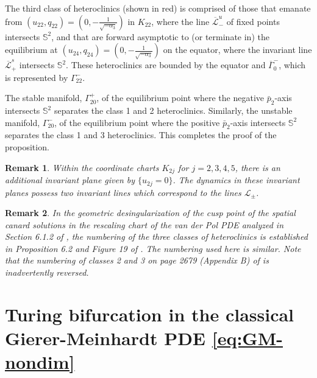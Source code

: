 \documentclass[11pt]{article}
\numberwithin{equation}{section}
\newtheorem{remark}{Remark}[section]
\begin{document}
The third class of heteroclinics (shown in red) is comprised of those that emanate from $(u_{22},q_{22})=(0,-\frac{1}{\sqrt{-\alpha_3}})$ in $K_{22}$, where the line $\overline{\mathcal{L}}^u_-$ of fixed points intersects $\mathbb{S}^2$, and that are forward asymptotic to (or terminate in) the equilibrium at $(u_{24},q_{24})=(0,-\frac{1}{\sqrt{-\alpha_3}})$ on the equator, where the invariant line $\overline{\mathcal{L}}_+^s$ intersects $\mathbb{S}^2$.
These heteroclinics are bounded by the equator and $\overline{\Gamma}_0^-$, which is represented by $\Gamma_{22}^-$.

The stable manifold, $\Gamma_{20}^+$, of the equilibrium point where the negative $\bar{p}_2$-axis intersects $\mathbb{S}^2$ separates the class 1 and 2 heteroclinics.
Similarly, the unstable manifold, $\Gamma_{20}^-$, of the equilibrium point where the positive $\bar{p}_2$-axis intersects $\mathbb{S}^2$ separates the class 1 and 3 heteroclinics.
This completes the proof of the proposition.

\begin{remark}
Within the coordinate charts $K_{2j}$ for $j=2,3,4,5$, there is an additional invariant plane given by $\{u_{2j}=0\}$.
The dynamics in these invariant planes possess two invariant lines which correspond to the lines $\mathcal{L}_\pm$. 
\end{remark}

\begin{remark}
    In the geometric desingularization of the cusp point of the spatial canard solutions in the rescaling chart of the van der Pol PDE analyzed in Section 6.1.2 of \cite{VDK2025}, the numbering of the three classes of heteroclinics is established in Proposition 6.2 and Figure 19 of \cite{VDK2025}.
    The numbering used here is similar.
    Note that the numbering of classes 2 and 3 on page 2679 (Appendix B) of \cite{VDK2025} is inadvertently reversed.
\end{remark}

\section{Turing bifurcation in the classical Gierer-Meinhardt PDE \texorpdfstring{\eqref{eq:GM-nondim}}{Lg}}
\label{app:GM-Turing}
\end{document}

